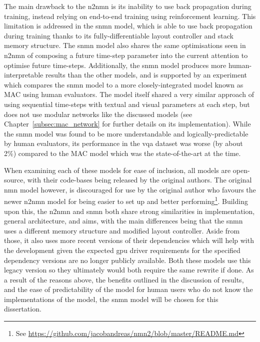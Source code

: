 The main drawback to the \gls{n2nmn} is its inability to use back propagation during training, instead relying on end-to-end training using reinforcement learning.
This limitation is addressed in the \gls{snmn} model, which is able to use back propagation during training thanks to its fully-differentiable layout controller and stack memory structure.
The \gls{snmn} model also shares the same optimisations seen in \gls{n2nmn} of composing a future time-step parameter into the current attention to optimise future time-steps.
Additionally, the \gls{snmn} model produces more human-interpretable results than the other models, and is supported by an experiment which compares the \gls{snmn} model to a more closely-integrated model known as MAC\cite{hudson_compositional_2018} using human evaluators.
The model itself shared a very similar approach of using sequential time-steps with textual and visual parameters at each step, but does not use modular networks like the discussed models (see Chapter~\ref{subsec:mac_network} for further details on its implementation).
While the \gls{snmn} model was found to be more understandable and logically-predictable by human evaluators, its performance in the \gls{vqa} dataset was worse (by about 2\%) compared to the MAC model which was the state-of-the-art at the time\cite{hu_explainable_2019}.

When examining each of these models for ease of inclusion, all models are open-source, with their code-bases being released by the original authors.
The original \gls{nmn} model however, is discouraged for use by the original author who favours the newer \gls{n2nmn} model for being easier to set up and better performing\footnote{See \url{https://github.com/jacobandreas/nmn2/blob/master/README.md}}.
Building upon this, the \gls{n2nmn} and \gls{snmn} both share strong similarities in implementation, general architecture, and aims, with the main differences being that the \gls{snmn} uses a different memory structure and modified layout controller.
Aside from those, it also uses more recent versions of their dependencies which will help with the development given the expected \acrshort{gpu} driver requirements for the specified dependency versions are no longer publicly available.
Both these models use this legacy version so they ultimately would both require the same rewrite if done.
As a result of the reasons above, the benefits outlined in the discussion of results,
and the ease of predictability of the model for human users who do not know the implementations of the model, the \gls{snmn} model will be chosen for this dissertation.


